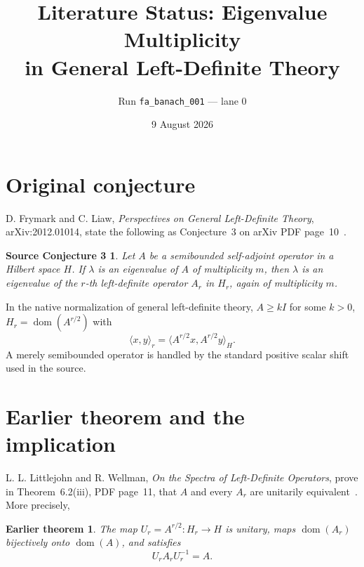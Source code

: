 \documentclass[11pt]{article}
\title{Literature Status: Eigenvalue Multiplicity\\
in General Left-Definite Theory}
\author{Run \texttt{fa\_banach\_001} --- lane 0}
\date{9 August 2026}
\newtheorem*{conjecture}{Source Conjecture 3}
\newtheorem*{theorem}{Earlier theorem}
\begin{document}
\maketitle

\begin{center}
\end{center}

\section{Original conjecture}

D. Frymark and C. Liaw, \emph{Perspectives on General Left-Definite Theory},
arXiv:2012.01014, state the following as Conjecture~3 on arXiv PDF
page~10~\cite{source}.

\begin{conjecture}
Let $A$ be a semibounded self-adjoint operator in a Hilbert space $H$. If
$\lambda$ is an eigenvalue of $A$ of multiplicity $m$, then $\lambda$ is an
eigenvalue of the $r$-th left-definite operator $A_r$ in $H_r$, again of
multiplicity $m$.
\end{conjecture}

In the native normalization of general left-definite theory, $A\geq kI$ for
some $k>0$, $H_r=\operatorname{dom}(A^{r/2})$ with
\[
 \langle x,y\rangle_r=\langle A^{r/2}x,A^{r/2}y\rangle_H.
\]
A merely semibounded operator is handled by the standard positive scalar
shift used in the source.

\section{Earlier theorem and the implication}

L. L. Littlejohn and R. Wellman, \emph{On the Spectra of Left-Definite
Operators}, prove in Theorem~6.2(iii), PDF page~11, that $A$ and every $A_r$
are unitarily equivalent~\cite{support}.  More precisely,

\begin{theorem}
The map $U_r=A^{r/2}:H_r\to H$ is unitary, maps
$\operatorname{dom}(A_r)$ bijectively onto $\operatorname{dom}(A)$, and
satisfies
\[
 U_r A_r U_r^{-1}=A.
\]
\end{theorem}
\end{document}
